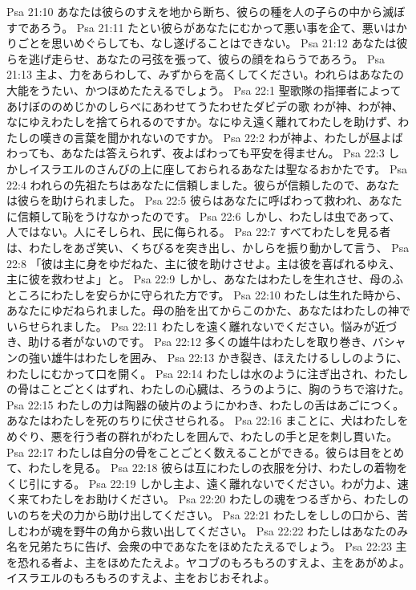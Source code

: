 Psa 21:10  あなたは彼らのすえを地から断ち、彼らの種を人の子らの中から滅ぼすであろう。
Psa 21:11  たとい彼らがあなたにむかって悪い事を企て、悪いはかりごとを思いめぐらしても、なし遂げることはできない。
Psa 21:12  あなたは彼らを逃げ走らせ、あなたの弓弦を張って、彼らの顔をねらうであろう。
Psa 21:13  主よ、力をあらわして、みずからを高くしてください。われらはあなたの大能をうたい、かつほめたたえるでしょう。
Psa 22:1  聖歌隊の指揮者によってあけぼののめじかのしらべにあわせてうたわせたダビデの歌 わが神、わが神、なにゆえわたしを捨てられるのですか。なにゆえ遠く離れてわたしを助けず、わたしの嘆きの言葉を聞かれないのですか。
Psa 22:2  わが神よ、わたしが昼よばわっても、あなたは答えられず、夜よばわっても平安を得ません。
Psa 22:3  しかしイスラエルのさんびの上に座しておられるあなたは聖なるおかたです。
Psa 22:4  われらの先祖たちはあなたに信頼しました。彼らが信頼したので、あなたは彼らを助けられました。
Psa 22:5  彼らはあなたに呼ばわって救われ、あなたに信頼して恥をうけなかったのです。
Psa 22:6  しかし、わたしは虫であって、人ではない。人にそしられ、民に侮られる。
Psa 22:7  すべてわたしを見る者は、わたしをあざ笑い、くちびるを突き出し、かしらを振り動かして言う、
Psa 22:8  「彼は主に身をゆだねた、主に彼を助けさせよ。主は彼を喜ばれるゆえ、主に彼を救わせよ」と。
Psa 22:9  しかし、あなたはわたしを生れさせ、母のふところにわたしを安らかに守られた方です。
Psa 22:10  わたしは生れた時から、あなたにゆだねられました。母の胎を出てからこのかた、あなたはわたしの神でいらせられました。
Psa 22:11  わたしを遠く離れないでください。悩みが近づき、助ける者がないのです。
Psa 22:12  多くの雄牛はわたしを取り巻き、バシャンの強い雄牛はわたしを囲み、
Psa 22:13  かき裂き、ほえたけるししのように、わたしにむかって口を開く。
Psa 22:14  わたしは水のように注ぎ出され、わたしの骨はことごとくはずれ、わたしの心臓は、ろうのように、胸のうちで溶けた。
Psa 22:15  わたしの力は陶器の破片のようにかわき、わたしの舌はあごにつく。あなたはわたしを死のちりに伏させられる。
Psa 22:16  まことに、犬はわたしをめぐり、悪を行う者の群れがわたしを囲んで、わたしの手と足を刺し貫いた。
Psa 22:17  わたしは自分の骨をことごとく数えることができる。彼らは目をとめて、わたしを見る。
Psa 22:18  彼らは互にわたしの衣服を分け、わたしの着物をくじ引にする。
Psa 22:19  しかし主よ、遠く離れないでください。わが力よ、速く来てわたしをお助けください。
Psa 22:20  わたしの魂をつるぎから、わたしのいのちを犬の力から助け出してください。
Psa 22:21  わたしをししの口から、苦しむわが魂を野牛の角から救い出してください。
Psa 22:22  わたしはあなたのみ名を兄弟たちに告げ、会衆の中であなたをほめたたえるでしょう。
Psa 22:23  主を恐れる者よ、主をほめたたえよ。ヤコブのもろもろのすえよ、主をあがめよ。イスラエルのもろもろのすえよ、主をおじおそれよ。

